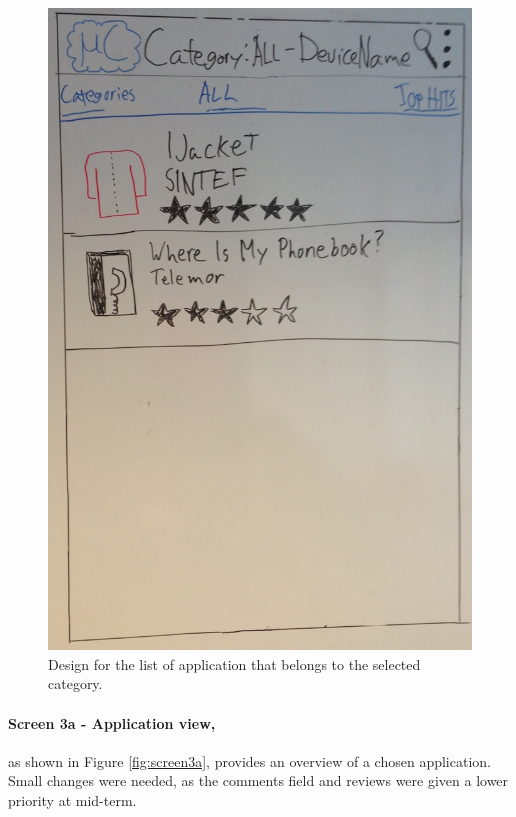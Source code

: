 \begin{figure}[H]
\centering
\includegraphics[scale=0.2]{images/Design_guide/Screen2b.png}
\caption[Screen 2b - Browse shop by category]{Design for the list of application that belongs to the selected category.}
\label{fig:screen2b}
\end{figure}


\paragraph{Screen 3a - Application view,} as shown in Figure \ref{fig:screen3a}, provides an overview of a chosen application. Small changes were needed, as the comments field and reviews were given a lower priority at mid-term.


